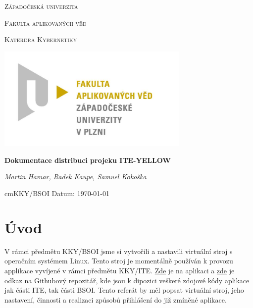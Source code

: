 \documentclass{article}
\begin{document}
\begin{titlepage}

    \centering

    {\scshape\LARGE Západočeská univerzita\par}
    {\scshape\Large Fakulta aplikovaných věd \par}
    {\scshape\Large Katerdra Kybernetiky \par}
    {\begin{center}
            \includegraphics[width=0.7\textwidth]{../pic/fav.jpg}
        \end{center}}

    {\huge\bfseries Dokumentace distribuci projeku ITE-YELLOW\par} %

    \vspace{2cm}

    {\Large\itshape Martin Hamar, Radek Kaupe, Samuel Kokoška\par}

    \vfill

    \vspace{1cm}

     cm{KKY/BSOI} \hfill {Datum: \today }



\end{titlepage}

\section{Úvod}
V rámci předmětu KKY/BSOI jsme si vytvořili a nastavili virtuální stroj s operačním systémem Linux. 
Tento stroj je momentálně používán k provozu applikace vyvíjené v rámci předmětu KKY/ITE. \href{http://147.228.173.162:8881}{Zde} je na aplikaci a \href{https://github.com/RadekKaupe/ITE-Yellow-2024}{zde} je odkaz na Githubový repozitář, kde jsou k dipozici veškeré zdojové kódy aplikace jak části ITE, tak části BSOI. 
Tento referát by měl popsat virtuální stroj, jeho nastavení, činnosti a realizaci způsobů přihlášení do již zmíněné aplikace.   
\end{document}
